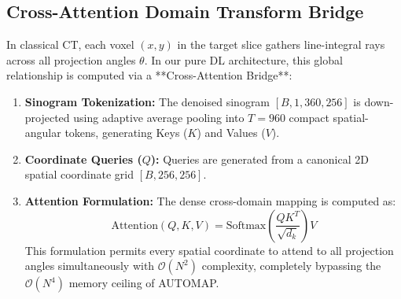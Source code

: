 \documentclass[10pt,a4paper]{article}
\begin{document}
\begin{center}
\end{center}

\subsection{Cross-Attention Domain Transform Bridge}
In classical CT, each voxel $(x, y)$ in the target slice gathers line-integral rays across all projection angles $\theta$. In our pure DL architecture, this global relationship is computed via a **Cross-Attention Bridge**:
\begin{enumerate}[leftmargin=*,noitemsep]
    \item \textbf{Sinogram Tokenization:} The denoised sinogram $[B, 1, 360, 256]$ is down-projected using adaptive average pooling into $T = 960$ compact spatial-angular tokens, generating Keys ($K$) and Values ($V$).
    \item \textbf{Coordinate Queries ($Q$):} Queries are generated from a canonical 2D spatial coordinate grid $[B, 256, 256]$.
    \item \textbf{Attention Formulation:} The dense cross-domain mapping is computed as:
    \begin{equation}
        \text{Attention}(Q, K, V) = \text{Softmax}\left(\frac{Q K^T}{\sqrt{d_k}}\right) V
    \end{equation}
    This formulation permits every spatial coordinate to attend to all projection angles simultaneously with $\mathcal{O}(N^2)$ complexity, completely bypassing the $\mathcal{O}(N^4)$ memory ceiling of AUTOMAP.
\end{enumerate}

\newpage
\end{document}
